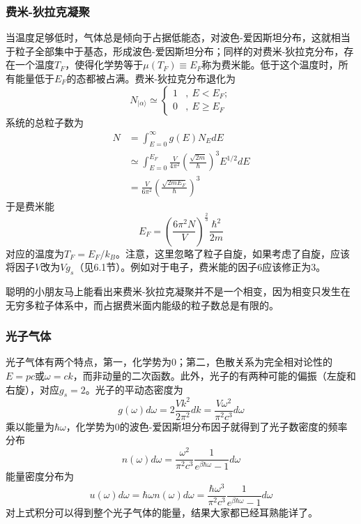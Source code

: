 \documentclass[a4paper,11pt]{ctexart}
\newcommand{\beq}{\begin{equation}}
\newcommand{\eeq}{\end{equation}}
\newcommand{\bea}{\begin{equation}\begin{aligned}}
\newcommand{\eea}{\end{aligned}\end{equation}}
\newcommand{\red}{\color{red}}
\begin{document}
\subsubsection{费米-狄拉克凝聚}
当温度足够低时，气体总是倾向于占据低能态，对波色-爱因斯坦分布，这就相当于粒子全部集中于基态，形成波色-爱因斯坦分布；同样的对费米-狄拉克分布，存在一个温度$T_F$，使得化学势等于$\mu(T_F) \equiv E_F$称为{\red 费米能}。低于这个温度时，所有能量低于$E_F$的态都被占满。费米-狄拉克分布退化为
\beq
N_{|\alpha \rangle} \simeq \begin{cases} 1 &, \ E < E_F;\\
0 &,\ E\geq E_F
\end{cases}
\eeq
系统的总粒子数为
\bea
N &= \int_{E= 0}^{\infty} g(E) N_E dE \\
&\simeq \int_{E= 0}^{E_F} \frac{V}{4\pi^2} \left(\frac{\sqrt{2m}}{\hbar}\right)^3 E^{1/2} dE \\
&=\frac{V}{6\pi^2} \left(\frac{\sqrt{2mE_F}}{\hbar}\right)^3
\eea
于是费米能
\beq
E_F= \left( \frac{6\pi^2 N}{V} \right)^{\frac{2}{3}} \frac{\hbar^2}{2m}
\eeq
对应的温度为$T_F = E_F/k_B$。注意，这里忽略了粒子自旋，如果考虑了自旋，应该将因子$V$改为$Vg_s$（见6.1节）。例如对于电子，费米能的因子6应该修正为3。
\par
聪明的小朋友马上能看出来费米-狄拉克凝聚并不是一个相变，因为相变只发生在无穷多粒子体系中，而占据费米面内能级的粒子数总是有限的。

\subsubsection{光子气体}
光子气体有两个特点，第一，化学势为0；第二，色散关系为完全相对论性的$E = pc$或$\omega = c k$，而非动量的二次函数。此外，光子的有两种可能的偏振（左旋和右旋），对应$g_s = 2$。光子的平动态密度为
\beq
g(\omega)d\omega = 2\frac{Vk^2}{2\pi^2} dk = \frac{V\omega^2}{\pi^2 c^3} d\omega
\eeq
乘以能量为$\hbar \omega$，化学势为0的波色-爱因斯坦分布因子就得到了光子数密度的频率分布
\beq
n(\omega)d\omega = \frac{\omega^2}{\pi^2 c^3}\frac{1}{ e^{\beta\hbar \omega} - 1} d\omega
\eeq
能量密度分布为
\beq
u(\omega)d\omega = \hbar \omega n(\omega) d\omega = \frac{\hbar \omega^3}{\pi^2 c^3}\frac{1}{ e^{\beta\hbar \omega} - 1} d\omega
\eeq
对上式积分可以得到整个光子气体的能量，结果大家都已经耳熟能详了。
\end{document}
